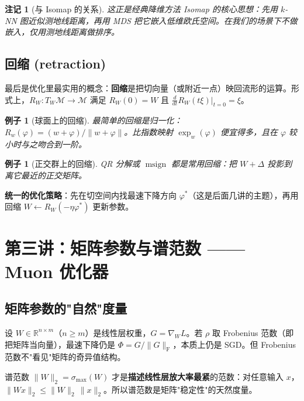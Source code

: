 \documentclass[11pt,a4paper]{article}
\theoremstyle{mythm}
\theoremstyle{mydef}
\newtheorem{example}[theorem]{例子}
\newtheorem{remark}[theorem]{注记}
\newcommand{\R}{\mathbb{R}}
\newcommand{\msign}{\operatorname{msign}}
\newcommand{\Frob}{\mathrm{F}}
\begin{document}
\begin{remark}[与 Isomap 的关系]
这正是经典降维方法 Isomap 的核心思想：先用 $k$-NN 图近似测地线距离，再用 MDS 把它嵌入低维欧氏空间。在我们的场景下不做嵌入，仅用测地线距离做排序。
\end{remark}

\subsection{回缩 (retraction)}

最后是优化里最实用的概念：\textbf{回缩}是把切向量（或附近一点）映回流形的运算。形式上，$R_W : T_W \mathcal{M} \to \mathcal{M}$ 满足 $R_W(0) = W$ 且 $\frac{d}{dt}R_W(t\xi)|_{t=0} = \xi$。

\begin{example}[球面上的回缩]
最简单的回缩是\emph{归一化}：$R_w(\varphi) = (w+\varphi)/\|w+\varphi\|$。比指数映射 $\exp_w(\varphi)$ 便宜得多，且在 $\varphi$ 较小时与之吻合到一阶。
\end{example}

\begin{example}[正交群上的回缩]
QR 分解或 $\msign$ 都是常用回缩：把 $W+\Delta$ 投影到离它最近的正交矩阵。
\end{example}

\textbf{统一的优化策略}：先在切空间内找最速下降方向 $\varphi^\ast$（这是后面几讲的主题），再用回缩 $W \leftarrow R_W(-\eta\varphi^\ast)$ 更新参数。

\section{第三讲：矩阵参数与谱范数 —— Muon 优化器}\label{sec:muon}

\subsection{矩阵参数的"自然"度量}

设 $W\in\R^{n\times m}$（$n\ge m$）是线性层权重，$G = \nabla_W L$。若 $\rho$ 取 Frobenius 范数（即把矩阵当向量），最速下降仍是 $\Phi = G/\|G\|_\Frob$，本质上仍是 SGD。但 Frobenius 范数不"看见"矩阵的奇异值结构。

谱范数 $\|W\|_2 = \sigma_{\max}(W)$ 才是\textbf{描述线性层放大率最紧}的范数：对任意输入 $x$，$\|Wx\|_2 \le \|W\|_2\,\|x\|_2$。所以谱范数是矩阵"稳定性"的天然度量。
\end{document}
